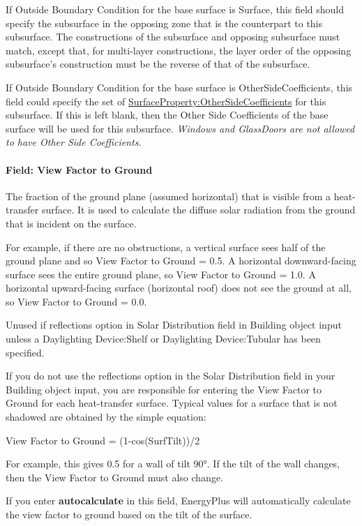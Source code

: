 If Outside Boundary Condition for the base surface is Surface, this field should specify the subsurface in the opposing zone that is the counterpart to this subsurface. The constructions of the subsurface and opposing subsurface must match, except that, for multi-layer constructions, the layer order of the opposing subsurface's construction must be the reverse of that of the subsurface.

If Outside Boundary Condition for the base surface is OtherSideCoefficients, this field could specify the set of \hyperref[surfacepropertyothersidecoefficients]{SurfaceProperty:OtherSideCoefficients} for this subsurface. If this is left blank, then the Other Side Coefficients of the base surface will be used for this subsurface. \emph{Windows and GlassDoors are not allowed to have Other Side Coefficients.}

\paragraph{Field: View Factor to Ground}\label{field-view-factor-to-ground-4}

The fraction of the ground plane (assumed horizontal) that is visible from a heat-transfer surface. It is used to calculate the diffuse solar radiation from the ground that is incident on the surface.

For example, if there are no obstructions, a vertical surface sees half of the ground plane and so View Factor to Ground = 0.5. A horizontal downward-facing surface sees the entire ground plane, so View Factor to Ground = 1.0. A horizontal upward-facing surface (horizontal roof) does not see the ground at all, so View Factor to Ground = 0.0.

Unused if reflections option in Solar Distribution field in Building object input unless a Daylighting Device:Shelf or Daylighting Device:Tubular has been specified.

If you do not use the reflections option in the Solar Distribution field in your Building object input, you are responsible for entering the View Factor to Ground for each heat-transfer surface. Typical values for a surface that is not shadowed are obtained by the simple equation:

View Factor to Ground = (1-cos(SurfTilt))/2

For example, this gives 0.5 for a wall of tilt 90°. If the tilt of the wall changes, then the View Factor to Ground must also change.

If you enter \textbf{autocalculate} in this field, EnergyPlus will automatically calculate the view factor to ground based on the tilt of the surface.

